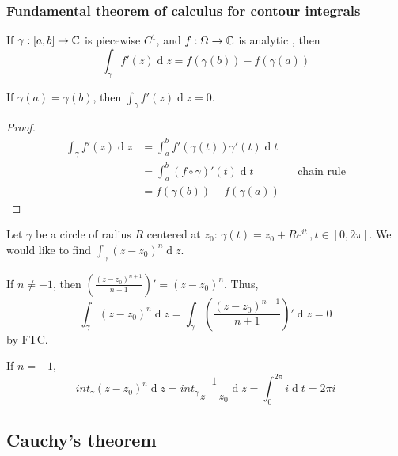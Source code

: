 \documentclass[12pt]{article}
\renewcommand{\d}{\ensuremath{\operatorname{d}}}
\begin{document}
\subsubsection{Fundamental theorem of calculus for contour integrals}
If $\gamma:[a,b]\to\mathbb{C}$ is piecewise $C^1$, and $f:\Omega\to \mathbb{C}$ is analytic ,
then \[\int_{\gamma}f'(z)\d z=f(\gamma(b))-f(\gamma(a))\]

If $\gamma(a)=\gamma(b)$, then $\int_{\gamma}f'(z)\d z=0$.

\begin{proof}
    \begin{align*}
        \int_{\gamma}f'(z)\d z&= \int_{a}^{b}f'(\gamma(t))\gamma'(t)\d t\\
        &= \int_{a}^{b}(f\circ \gamma)'(t)\d t &&\text{chain rule}\\
        &= f(\gamma(b))-f(\gamma(a))
    \end{align*}
\end{proof}

\eg Let $\gamma$ be a circle of radius $R$ centered at $z_0$: $\gamma(t)=z_0+Re^{it}\, ,t\in [0,2\pi]$. We would like to find \(\int_{\gamma}(z-z_0)^n\d z\).

If $n\neq -1$, then $\left(\frac{(z-z_0)^{n+1}}{n+1}\right)' = (z-z_0)^n$. Thus, \[\int_{\gamma}(z-z_0)^n\d z = \int_{\gamma}\left(\frac{(z-z_0)^{n+1}}{n+1}\right)'\d z =0\] by FTC. 

If $n=-1$, \[int_{\gamma}(z-z_0)^n\d z= int_{\gamma}\frac{1}{z-z_0}\d z = \int_{0}^{2\pi}i\d t=2\pi i\]

\subsection{Cauchy's theorem}
\end{document}
